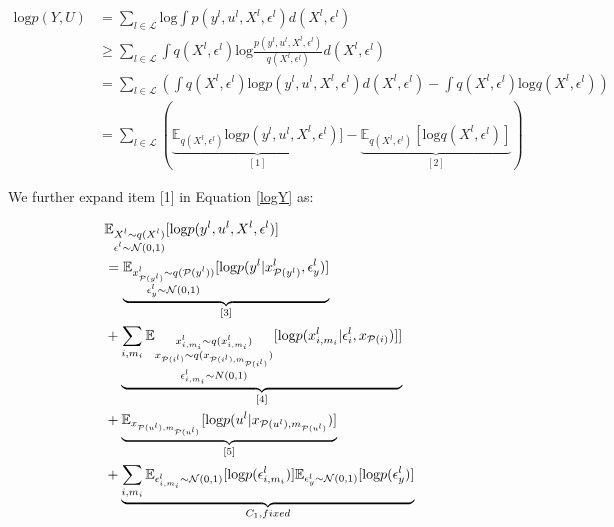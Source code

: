 \documentclass[review]{elsarticle}
\begin{document}
\begin{equation} 
\begin{aligned}
\text{log}p(Y,U) & = \sum_{l \in \mathcal{L}}\text{log}\int p(y^l,u^l,X^l,\epsilon^l)d(X^l,\epsilon^{l}) \\
 & \geq \sum_{l \in \mathcal{L}} \int q(X^l,\epsilon^l) \text{log}\frac{p(y^l,u^l,X^l,\epsilon^l)}{q(X^l,\epsilon^l)}d(X^l,\epsilon^l) \\
  & = \sum_{l \in \mathcal{L}}(\int q(X^l,\epsilon^l)\text{log}p(y^l,u^l,X^l,\epsilon^l)d(X^l,\epsilon^l) - \int q(X^l,\epsilon^l)\text{log} q(X^l,\epsilon^l)) \\
 & = \sum_{l \in \mathcal{L}}(\underbrace{\mathbb{E}_{q(X^l,\epsilon^l)}\text{log}p(y^l,u^l,X^l,\epsilon^l)]}_{[1]} - \underbrace{\mathbb{E}_{q(X^l,\epsilon^l)}[\text{log} q(X^l,\epsilon^l)]}_{[2]})
\end{aligned}
\label{logY}
\end{equation}



\noindent We further expand item [1] in Equation \ref{logY} as:

\begin{equation}
\begin{aligned}
 & \mathbb{E}_{ \begin{subarray}{c} X^{l} \sim q(X^{l})\\ \epsilon^{l} \sim \mathcal N(0,1)\end{subarray}}[\text{log}p(y^{l},u^{l},X^{l},\epsilon^{l})] \\
 & = \underbrace{\mathbb{E}_{\begin{subarray}{c} x_{\mathcal{P}(y^l)}^l \sim q(\mathcal{P}(y^l))\\  \epsilon_{y}^l \sim \mathcal N(0,1)\end{subarray}}[\text{log}p(y^l|x_{\mathcal{P}(y^l)}^l,\epsilon_{y}^l)]}_{[3]} \\
 & + \underbrace{\sum_{i,m_i}\mathbb{E}_{\begin{subarray}{c}  x_{i,m_i}^l \sim q(x_{i,m_i}^l)\\ x_{\mathcal{P}(i^{l})} \sim q(x_{\mathcal{P}(i^{l}),m_{\mathcal{P}(i^{l})}})\\  \epsilon_{i,m_i}^l \sim N(0,1) \end{subarray}}[\text{log}p(x_{i,m_i}^l|\epsilon_{i}^l,x_{\mathcal{P}(i)})]]}_{[4]}\\
 & + \underbrace{\mathbb{E}_{x_{\mathcal{P}(u^l), m_{\mathcal{P}(u^l)}}}[\text{log}p(u^l|x_{\mathcal{P}(u^l), m_{\mathcal{P}(u^l)}})]}_{[5]}\\
 & + \underbrace{\sum_{i,m_i} \mathbb{E}_{\epsilon_{i,m_i}^l \sim \mathcal N(0,1)}[\text{log}p(\epsilon_{i,m_i}^{l})] \mathbb{E}_{\epsilon_{y}^{l} \sim \mathcal N(0,1)}[\text{log}p(\epsilon_{y}^{l})]}_{C_1,fixed}\\
\end{aligned}
\label{expand}
\end{equation}
\end{document}
